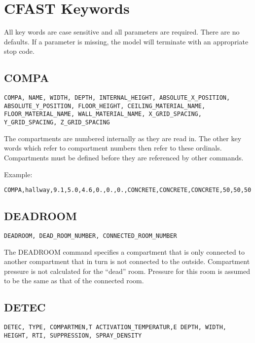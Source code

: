 \chapter{CFAST Keywords}

All key words are case sensitive and all parameters are required. There are no defaults. If a parameter is missing, the model will terminate with an appropriate stop code.

\section{COMPA}

\begin{lstlisting}
COMPA, NAME, WIDTH, DEPTH, INTERNAL_HEIGHT, ABSOLUTE_X_POSITION, ABSOLUTE_Y_POSITION, FLOOR_HEIGHT, CEILING_MATERIAL_NAME,  FLOOR_MATERIAL_NAME, WALL_MATERIAL_NAME, X_GRID_SPACING, Y_GRID_SPACING, Z_GRID_SPACING
\end{lstlisting}

The compartments are numbered internally as they are read in. The other key words which refer to compartment numbers then refer to these ordinals. Compartments must be defined before they are referenced by other commands.

Example:

\begin{lstlisting}
COMPA,hallway,9.1,5.0,4.6,0.,0.,0.,CONCRETE,CONCRETE,CONCRETE,50,50,50
\end{lstlisting}

\section{DEADROOM}

\begin{lstlisting}
DEADROOM, DEAD_ROOM_NUMBER, CONNECTED_ROOM_NUMBER
\end{lstlisting}

The DEADROOM command specifies a compartment that is only connected to another compartment that in turn is not connected to the outside.  Compartment pressure is not calculated for the ``dead'' room. Pressure for this room is assumed to be the same as that of the connected room.

\section{DETEC}

\begin{lstlisting}
DETEC, TYPE, COMPARTMEN,T ACTIVATION_TEMPERATUR,E DEPTH, WIDTH, HEIGHT, RTI, SUPPRESSION, SPRAY_DENSITY
\end{lstlisting}

